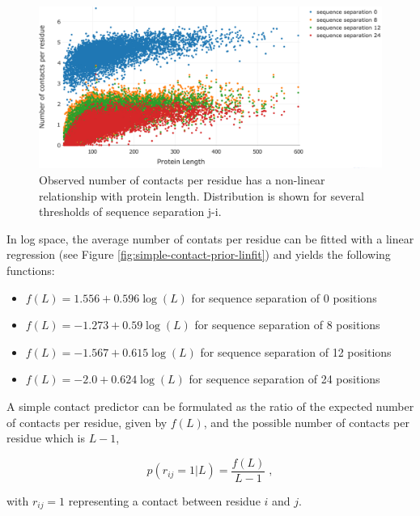 \documentclass[11pt,a4paper,twoside]{book}
\providecommand{\tightlist}{%
  \setlength{\itemsep}{0pt}\setlength{\parskip}{0pt}}
\theoremstyle{definition}
\theoremstyle{definition}
\theoremstyle{remark}
\begin{document}
\begin{figure}

{\centering \includegraphics[width=0.8\linewidth]{img/random_forest_contact_prior/no_contacts_per_residue_vs_protein_length_thr8} 

}

\caption{Observed
number of contacts per residue has a non-linear relationship with
protein length. Distribution is shown for several thresholds of sequence
separation \textbar{}j-i\textbar{}.}\label{fig:avg-nr-contacts-per-residue-vs-protein-length}
\end{figure}

In log space, the average number of contats per residue can be fitted
with a linear regression (see Figure
\ref{fig:simple-contact-prior-linfit}) and yields the following
functions:

\begin{itemize}
\tightlist
\item
  \(f(L) = 1.556 + 0.596 \log (L)\) for sequence separation of 0
  positions
\item
  \(f(L) = -1.273 + 0.59 \log (L)\) for sequence separation of 8
  positions
\item
  \(f(L) = -1.567 + 0.615 \log (L)\) for sequence separation of 12
  positions
\item
  \(f(L) = -2.0 + 0.624 \log (L)\) for sequence separation of 24
  positions
\end{itemize}

A simple contact predictor can be formulated as the ratio of the
expected number of contacts per residue, given by \(f(L)\), and the
possible number of contacts per residue which is \(L-1\),

\[
p(r_{ij} = 1 | L) = \frac{f(L)}{L-1} \; ,
\]

with \(r_{ij}=1\) representing a contact between residue \(i\) and
\(j\).
\end{document}
